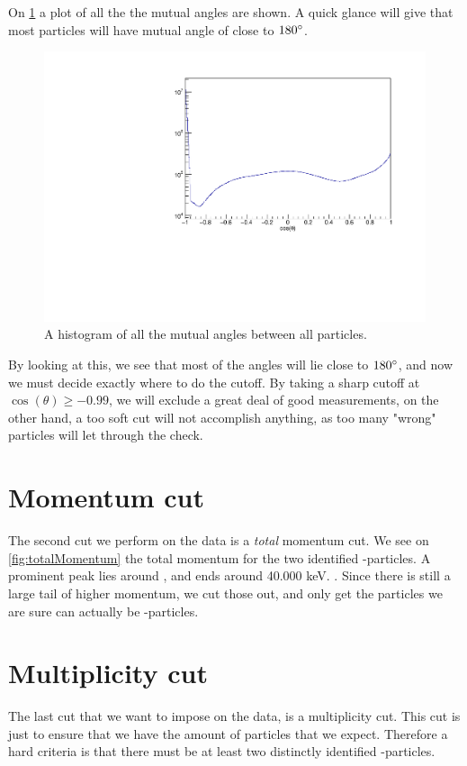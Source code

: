 On \cref{fig:cosAll} a plot of all the the mutual angles are shown. A quick glance will give that most particles will have mutual angle of close to $180\degree$. 

\begin{figure}[h]
	\centering
	\includegraphics[width=\linewidth]{../figures/cosang.pdf}
	\caption{A histogram of all the mutual angles between all particles.}
	\label{fig:cosAll}
\end{figure}

By looking at this, we see that most of the angles will lie close to $180\degree$, and now we must decide exactly where to do the cutoff. 
By taking a sharp cutoff at $\cos(\theta) \geq -0.99$, we will exclude a great deal of good measurements, on the other hand, a too soft cut will not accomplish anything, as too many "wrong" particles will let through the check. 



\section{Momentum cut}
The second cut we perform on the data is a \textit{total} momentum cut. We see on \cref{fig:totalMomentum} the total momentum for the two identified \al-particles. 
A prominent peak lies around , and ends around 40.000 keV. . Since there is still a large tail of higher momentum, we cut those out, and only get the particles we are sure can actually be \al-particles. 

\section{Multiplicity cut}
The last cut that we want to impose on the data, is a multiplicity cut. This cut is just to ensure that we have the amount of particles that we expect. 
Therefore a hard criteria is that there must be at least two distinctly identified \al-particles. \\


